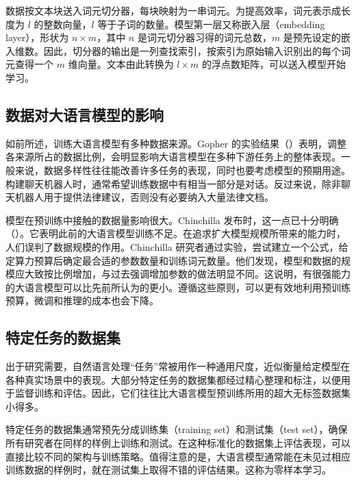 数据按文本块送入词元切分器，每块映射为一串词元。为提高效率，词元表示成长度为 $l$ 的整数向量，$l$ 等于子词的数量。模型第一层又称嵌入层（embedding layer），形状为 $n\times m$，其中 $n$ 是词元切分器习得的词元总数，$m$ 是预先设定的嵌入维数。因此，切分器的输出是一列查找索引，按索引为原始输入识别出的每个词元查得一个 $m$ 维向量。文本由此转换为 $l\times m$ 的浮点数矩阵，可以送入模型开始学习。

\subsection{数据对大语言模型的影响}
如前所述，训练大语言模型有多种数据来源。Gopher 的实验结果（）表明，调整各来源所占的数据比例，会明显影响大语言模型在多种下游任务上的整体表现。一般来说，数据多样性往往能改善许多任务的表现，同时也要考虑模型的预期用途。构建聊天机器人时，通常希望训练数据中有相当一部分是对话。反过来说，除非聊天机器人用于提供法律建议，否则没有必要纳入大量法律文档。

\begin{keypoint}
模型在预训练中接触的数据量影响很大。Chinchilla 发布时，这一点已十分明确（）。它表明此前的大语言模型训练不足。在追求扩大模型规模所带来的能力时，人们误判了数据规模的作用。Chinchilla 研究者通过实验，尝试建立一个公式，给定算力预算后确定最合适的参数数量和训练词元数量。他们发现，模型和数据的规模应大致按比例增加，与过去强调增加参数的做法明显不同。这说明，有很强能力的大语言模型可以比先前所认为的更小。遵循这些原则，可以更有效地利用预训练预算，微调和推理的成本也会下降。
\end{keypoint}

\subsection{特定任务的数据集}
出于研究需要，自然语言处理“任务”常被用作一种通用尺度，近似衡量给定模型在各种真实场景中的表现。大部分特定任务的数据集都经过精心整理和标注，以便用于监督训练和评估。因此，它们往往比大语言模型预训练所用的超大无标签数据集小得多。

特定任务的数据集通常预先分成训练集（training set）和测试集（test set），确保所有研究者在同样的样例上训练和测试。在这种标准化的数据集上评估表现，可以直接比较不同的架构与训练策略。值得注意的是，大语言模型通常能在未见过相应训练数据的样例时，就在测试集上取得不错的评估结果。这称为零样本学习。
